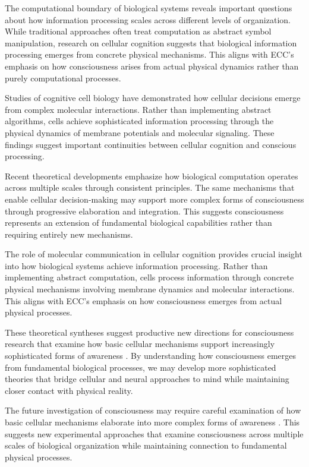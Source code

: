 \begin{refsection}
The computational boundary of biological systems \cite{Levin2019} reveals important questions about how information processing scales across different levels of organization. While traditional approaches often treat computation as abstract symbol manipulation, research on cellular cognition suggests that biological information processing emerges from concrete physical mechanisms. This aligns with ECC's emphasis on how consciousness arises from actual physical dynamics rather than purely computational processes.

Studies of cognitive cell biology \cite{Mitchell2016} have demonstrated how cellular decisions emerge from complex molecular interactions. Rather than implementing abstract algorithms, cells achieve sophisticated information processing through the physical dynamics of membrane potentials and molecular signaling. These findings suggest important continuities between cellular cognition and conscious processing.

Recent theoretical developments \cite{Fields2020} emphasize how biological computation operates across multiple scales through consistent principles. The same mechanisms that enable cellular decision-making may support more complex forms of consciousness through progressive elaboration and integration. This suggests consciousness represents an extension of fundamental biological capabilities rather than requiring entirely new mechanisms.

The role of molecular communication in cellular cognition \cite{Manicka2019} provides crucial insight into how biological systems achieve information processing. Rather than implementing abstract computation, cells process information through concrete physical mechanisms involving membrane dynamics and molecular interactions. This aligns with ECC's emphasis on how consciousness emerges from actual physical processes.

These theoretical syntheses suggest productive new directions for consciousness research that examine how basic cellular mechanisms support increasingly sophisticated forms of awareness \cite{Baluska2016}. By understanding how consciousness emerges from fundamental biological processes, we may develop more sophisticated theories that bridge cellular and neural approaches to mind while maintaining closer contact with physical reality.

The future investigation of consciousness may require careful examination of how basic cellular mechanisms elaborate into more complex forms of awareness \cite{Lyon2015}. This suggests new experimental approaches that examine consciousness across multiple scales of biological organization while maintaining connection to fundamental physical processes.


\end{refsection}
